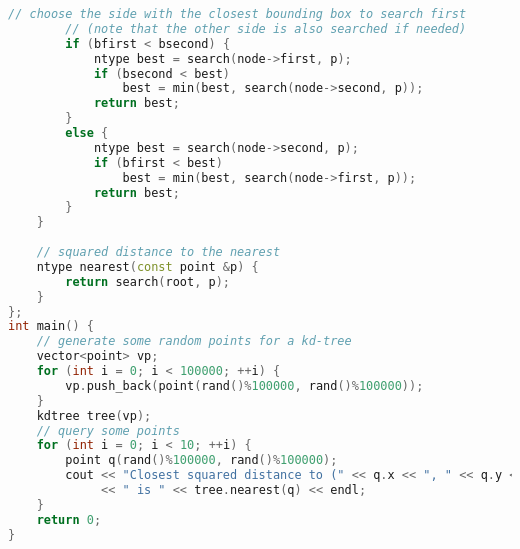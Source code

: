 \begin{lstlisting}[language=C++]
        // choose the side with the closest bounding box to search first
        // (note that the other side is also searched if needed)
        if (bfirst < bsecond) {
            ntype best = search(node->first, p);
            if (bsecond < best)
                best = min(best, search(node->second, p));
            return best;
        }
        else {
            ntype best = search(node->second, p);
            if (bfirst < best)
                best = min(best, search(node->first, p));
            return best;
        }
    }
    
    // squared distance to the nearest 
    ntype nearest(const point &p) {
        return search(root, p);
    }
};
int main() {
    // generate some random points for a kd-tree
    vector<point> vp;
    for (int i = 0; i < 100000; ++i) {
        vp.push_back(point(rand()%100000, rand()%100000));
    }
    kdtree tree(vp);
    // query some points
    for (int i = 0; i < 10; ++i) {
        point q(rand()%100000, rand()%100000);
        cout << "Closest squared distance to (" << q.x << ", " << q.y << ")"
             << " is " << tree.nearest(q) << endl;
    }
    return 0;
}
\end{lstlisting}
